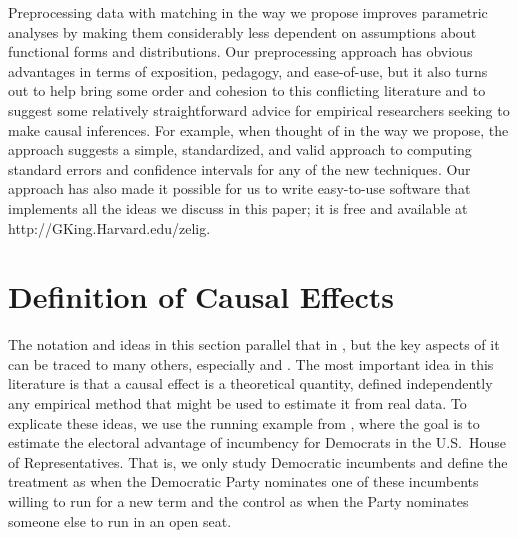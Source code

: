 \documentclass[11pt,titlepage]{article}
\begin{document}
Preprocessing data with matching in the way we propose improves
parametric analyses by making them considerably less dependent on
assumptions about functional forms and distributions.  Our
preprocessing approach has obvious advantages in terms of exposition,
pedagogy, and ease-of-use, but it also turns out to help bring some
order and cohesion to this conflicting literature and to suggest some
relatively straightforward advice for empirical researchers seeking to
make causal inferences.  For example, when thought of in the way we
propose, the approach suggests a simple, standardized, and valid
approach to computing standard errors and confidence intervals for any
of the new techniques.  Our approach has also made it possible for us
to write easy-to-use software that implements all the ideas we discuss
in this paper; it is free and available at http://GKing.Harvard.edu/zelig.

\section{Definition of Causal Effects}

The notation and ideas in this section parallel that in \citet[][\S
  3.1.1]{KinKeoVer94}, but the key aspects of it can be traced to many
others, especially \citet{Rubin74} and \citet{Holland86}.  The most
important idea in this literature is that a causal effect is a
theoretical quantity, defined independently any empirical method that
might be used to estimate it from real data.  To explicate these
ideas, we use the running example from \citet[][\S
  3.1.1]{KinKeoVer94}, where the goal is to estimate the electoral
advantage of incumbency for Democrats in the U.S.\ House of
Representatives.  That is, we only study Democratic incumbents and
define the treatment as when the Democratic Party nominates one of
these incumbents willing to run for a new term and the control as when
the Party nominates someone else to run in an open seat.
\end{document}
